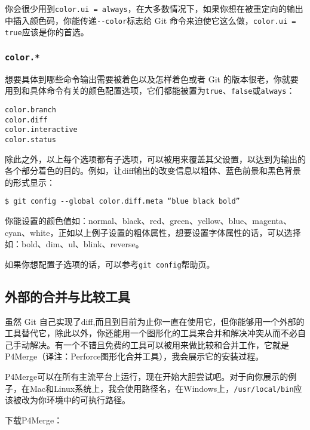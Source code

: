 \documentclass[a4paper]{book}
\begin{document}
你会很少用到\texttt{color.ui = always}，在大多数情况下，如果你想在被重定向的输出中插入颜色码，你能传递\texttt{-{}-color}标志给 Git 命令来迫使它这么做，\texttt{color.ui = true}应该是你的首选。

\subsubsection{\texttt{color.*}}

想要具体到哪些命令输出需要被着色以及怎样着色或者 Git 的版本很老，你就要用到和具体命令有关的颜色配置选项，它们都能被置为\texttt{true}、\texttt{false}或\texttt{always}：

\begin{shaded}\begin{verbatim}
color.branch
color.diff
color.interactive
color.status
\end{verbatim}\end{shaded}

除此之外，以上每个选项都有子选项，可以被用来覆盖其父设置，以达到为输出的各个部分着色的目的。例如，让diff输出的改变信息以粗体、蓝色前景和黑色背景的形式显示：

\begin{shaded}\begin{verbatim}
$ git config --global color.diff.meta “blue black bold”
\end{verbatim}\end{shaded}

你能设置的颜色值如：normal、black、red、green、yellow、blue、magenta、cyan、white，正如以上例子设置的粗体属性，想要设置字体属性的话，可以选择如：bold、dim、ul、blink、reverse。

如果你想配置子选项的话，可以参考\texttt{git config}帮助页。

\subsection{外部的合并与比较工具}

虽然 Git 自己实现了diff,而且到目前为止你一直在使用它，但你能够用一个外部的工具替代它，除此以外，你还能用一个图形化的工具来合并和解决冲突从而不必自己手动解决。有一个不错且免费的工具可以被用来做比较和合并工作，它就是P4Merge（译注：Perforce图形化合并工具），我会展示它的安装过程。

P4Merge可以在所有主流平台上运行，现在开始大胆尝试吧。对于向你展示的例子，在Mac和Linux系统上，我会使用路径名，在Windows上，\texttt{/usr/local/bin}应该被改为你环境中的可执行路径。

下载P4Merge：
\end{document}
